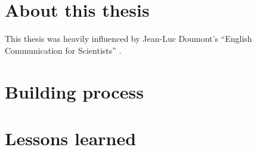 \chapter{About this thesis}

This thesis was heavily influenced by Jean-Luc Doumont's \enquote{English Communication for Scientists} .

\chapter{Building process}

\chapter{Lessons learned}
